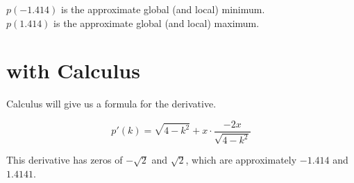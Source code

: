 \documentclass{ximera}
\begin{document}
$p(-1.414)$ is the approximate global (and local) minimum. \\

$p(1.414)$ is the approximate global (and local) maximum. \\




\section{with Calculus}


Calculus will give us a formula for the derivative.

\[    p'(k) = \sqrt{4 - k^2} + x \cdot \frac{-2x}{\sqrt{4-k^2}}  \]


This derivative has zeros of $-\sqrt{2}$ and $\sqrt{2}$, which are approximately $-1.414$ and $1.4141$. 
\end{document}
